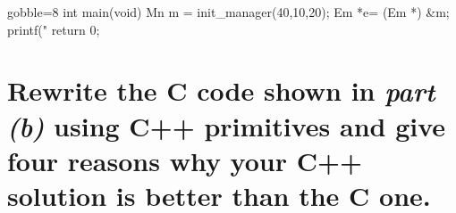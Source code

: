 \documentclass[NewMint]{supervision}
\begin{document}
\begin{questions}
\begin{parts}
\begin{cppcode*}{gobble=8}
        int main(void) { 
            Mn m = init_manager(40,10,20); 
            Em *e= (Em *) &m; 
            printf("%
            return 0; 
        }
        \end{cppcode*}
        
        \part[8]{Rewrite the C code shown in \emph{part (b)} using C++ primitives and give four reasons why your C++ solution is better than the C one.}

    \end{parts}


\end{questions}
\end{document}
